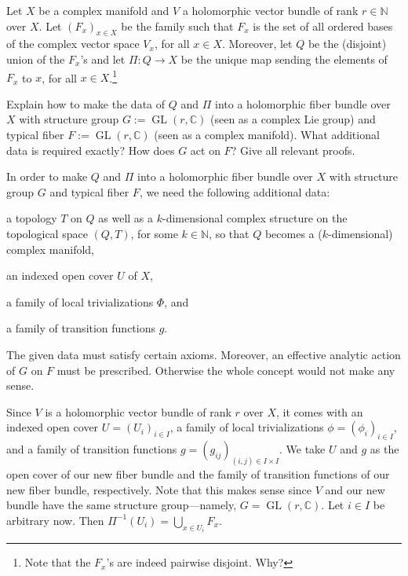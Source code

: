 \documentclass[a4paper]{amsart}
\newcommand{\N}{\mathbb{N}}
\newcommand{\C}{\mathbb{C}}
\theoremstyle{remark}
\numberwithin{equation}{question}
\DeclareMathOperator{\GL}{GL}
\begin{document}
\begin{question}[name=Exercise*, subtitle=The holomorphic frame bundle, print]
\label{qu:frame bundle}
Let $X$ be a complex manifold and $V$ a holomorphic vector bundle of rank $r \in \N$ over $X$. Let $(F_x)_{x \in X}$ be the family such that $F_x$ is the set of all ordered bases of the complex vector space $V_x$, for all $x \in X$. Moreover, let $Q$ be the (disjoint) union of the $F_x$'s and let $\Pi \colon Q \to X$ be the unique map sending the elements of $F_x$ to $x$, for all $x \in X$.\footnote{Note that the $F_x$'s are indeed pairwise disjoint. Why?}

Explain how to make the data of $Q$ and $\Pi$ into a holomorphic fiber bundle over $X$ with structure group $G := \GL(r,\C)$ (seen as a complex Lie group) and typical fiber $F := \GL(r,\C)$ (seen as a complex manifold). What additional data is required exactly? How does $G$ act on $F$? Give all relevant proofs.
\end{question}

\begin{solution}[print]
In order to make $Q$ and $\Pi$ into a holomorphic fiber bundle over $X$ with structure group $G$ and typical fiber $F$, we need the following additional data:
\begin{solenum}[label=\arabic*.]
\item a topology $T$ on $Q$ as well as a $k$-dimensional complex structure on the topological space $(Q,T)$, for some $k \in \N$, so that $Q$ becomes a ($k$-dimensional) complex manifold,
\item an indexed open cover $U$ of $X$,
\item a family of local trivializations $\Phi$, and
\item a family of transition functions $g$.
\end{solenum}
The given data must satisfy certain axioms.
Moreover, an effective analytic action of $G$ on $F$ must be prescribed. Otherwise the whole concept would not make any sense.

Since $V$ is a holomorphic vector bundle of rank $r$ over $X$, it comes with an indexed open cover $U = (U_i)_{i \in I}$, a family of local trivializations $\phi = (\phi_i)_{i \in I}$, and a family of transition functions $g = (g_{ij})_{(i,j) \in I\times I}$. We take $U$ and $g$ as the open cover of our new fiber bundle and the family of transition functions of our new fiber bundle, respectively. Note that this makes sense since $V$ and our new bundle have the same structure group---namely, $G = \GL(r,\C)$. Let $i \in I$ be arbitrary now. Then $\Pi^{-1}(U_i) = \bigcup_{x \in U_i} F_x$.
\end{solution}
\end{document}
